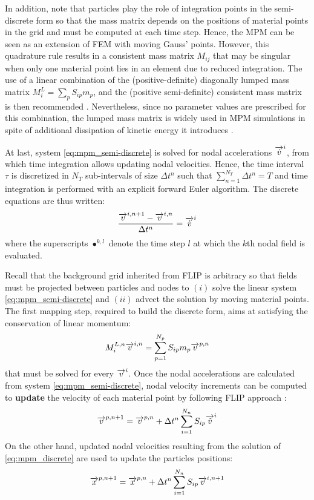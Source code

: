 In addition, note that particles play the role of integration points in the semi-discrete form so that the mass matrix depends on the positions of material points in the grid and must be computed at each time step. Hence, the MPM can be seen as an extension of FEM with moving Gauss' points. However, this quadrature rule results in a consistent mass matrix $M_{ij}$ that may be singular when only one material point lies in an element due to reduced integration. The use of a linear combination of the (positive-definite) diagonally lumped mass matrix $M^L_i=\sum_p S_{ip}m_p$, and the (positive semi-definite) consistent mass matrix is then recommended \cite{Love}. Nevertheless, since no parameter values are prescribed for this combination, the lumped mass matrix is widely used in MPM simulations in spite of additional dissipation of kinetic energy it introduces \cite{Mass_Flip}. 

At last, system \eqref{eq:mpm_semi-discrete} is solved for nodal accelerations ${\overrightarrow{\dot{v}}}^i$, from which time integration allows updating nodal velocities. Hence, the time interval $\tau$ is discretized in $N_T$ sub-intervals of size $\Delta t^n$ such that $\sum_{n=1}^{N_T} \Delta t^n = T$ and time integration is performed with an explicit forward Euler algorithm. The discrete equations are thus written:
\begin{equation}
  \label{eq:mpm_discrete}
  \frac{{\overrightarrow{v}}^{i,n+1}-{\overrightarrow{v}}^{i,n}}{\Delta t^n} = {\overrightarrow{\dot{v}}}^i
\end{equation}
where the superscripts $\bullet^{k,l}$ denote the time step $l$ at which the $k$th nodal field is evaluated. 

Recall that the background grid inherited from FLIP is arbitrary so that fields must be projected between particles and nodes to $(i)$ solve the linear system \eqref{eq:mpm_semi-discrete} and $(ii)$ advect the solution by moving material points. The first mapping step, required to build the discrete form, aims at satisfying the conservation of linear momentum:
\begin{equation}
  \label{eq:particles2nodes}
  M^{L,n}_i {\overrightarrow{v}}^{i,n} = \sum_{p=1}^{N_p} S_{ip}m_p {\overrightarrow{v}}^{p,n}
\end{equation}
that must be solved for every ${\overrightarrow{v}}^i$. Once the nodal accelerations are calculated from system \eqref{eq:mpm_semi-discrete}, nodal velocity increments can be computed to \textbf{update} the velocity of each material point by following FLIP approach \cite{PIC_Nishiguchi}:
\begin{equation}
  \label{eq:mp_velocity_update}
  {\overrightarrow{v}}^{p,n+1}= {\overrightarrow{v}}^{p,n}+ \Delta t^n \sum_{i=1}^{N_n} S_{ip}{\overrightarrow{\dot{v}}}^{i}
\end{equation}
On the other hand, updated nodal velocities resulting from the solution of \eqref{eq:mpm_discrete} are used to update the particles positions:
\begin{equation}
  \label{eq:position_update}
  {\overrightarrow{x}}^{p,n+1}={\overrightarrow{x}}^{p,n} + \Delta t^n\sum_{i=1}^{N_n} S_{ip}{\overrightarrow{v}}^{i,n+1} 
\end{equation}

